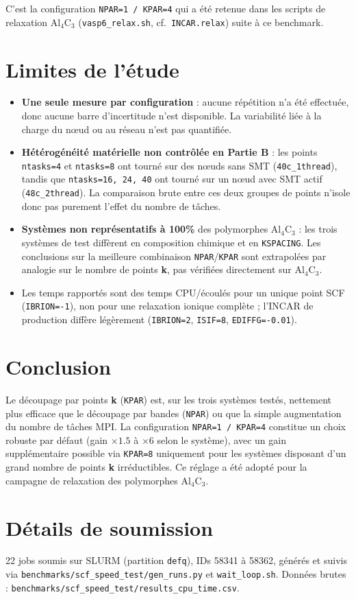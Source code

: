 \documentclass[11pt,a4paper]{article}
\begin{document}
C'est la configuration \texttt{NPAR=1 / KPAR=4} qui a été retenue dans les scripts de relaxation
Al$_4$C$_3$ (\texttt{vasp6\_relax.sh}, cf.\ \texttt{INCAR.relax}) suite à ce benchmark.

\section{Limites de l'étude}
\label{sec:limites}

\begin{itemize}
  \item \textbf{Une seule mesure par configuration} : aucune répétition n'a été effectuée, donc
  aucune barre d'incertitude n'est disponible. La variabilité liée à la charge du nœud ou au
  réseau n'est pas quantifiée.
  \item \textbf{Hétérogénéité matérielle non contrôlée en Partie B} : les points
  \texttt{ntasks=4} et \texttt{ntasks=8} ont tourné sur des nœuds sans SMT
  (\texttt{40c\_1thread}), tandis que \texttt{ntasks=16, 24, 40} ont tourné sur un nœud avec SMT
  actif (\texttt{48c\_2thread}). La comparaison brute entre ces deux groupes de points n'isole
  donc pas purement l'effet du nombre de tâches.
  \item \textbf{Systèmes non représentatifs à 100\%} des polymorphes Al$_4$C$_3$ : les trois
  systèmes de test diffèrent en composition chimique et en \texttt{KSPACING}. Les conclusions sur
  la meilleure combinaison \texttt{NPAR}/\texttt{KPAR} sont extrapolées par analogie sur le
  nombre de points \textbf{k}, pas vérifiées directement sur Al$_4$C$_3$.
  \item Les temps rapportés sont des temps CPU/écoulés pour un unique point SCF
  (\texttt{IBRION=-1}), non pour une relaxation ionique complète ; l'INCAR de production diffère
  légèrement (\texttt{IBRION=2}, \texttt{ISIF=8}, \texttt{EDIFFG=-0.01}).
\end{itemize}

\section{Conclusion}

Le découpage par points \textbf{k} (\texttt{KPAR}) est, sur les trois systèmes testés, nettement
plus efficace que le découpage par bandes (\texttt{NPAR}) ou que la simple augmentation du nombre
de tâches MPI. La configuration \texttt{NPAR=1 / KPAR=4} constitue un choix robuste par défaut
(gain $\times1.5$ à $\times6$ selon le système), avec un gain supplémentaire possible via
\texttt{KPAR=8} uniquement pour les systèmes disposant d'un grand nombre de points \textbf{k}
irréductibles. Ce réglage a été adopté pour la campagne de relaxation des polymorphes Al$_4$C$_3$.

\appendix
\section{Détails de soumission}

22 jobs soumis sur SLURM (partition \texttt{defq}), IDs 58341 à 58362, générés et suivis via
\texttt{benchmarks/scf\_speed\_test/gen\_runs.py} et \texttt{wait\_loop.sh}. Données brutes :
\texttt{benchmarks/scf\_speed\_test/results\_cpu\_time.csv}.
\end{document}
